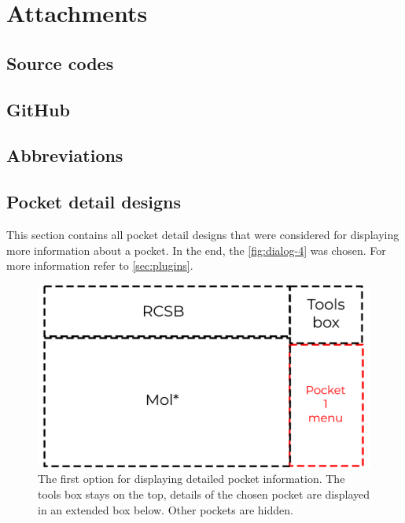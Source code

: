 \chapter{Attachments}

\section{Source codes}

\section{GitHub}

\section{Abbreviations}

\section{Pocket detail designs}
\label{sec:pocket_detail_designs}

This section contains all pocket detail designs that were considered for displaying more information about a pocket. In the end, the \cref{fig:dialog-4} was chosen. For more information refer to \cref{sec:plugins}.

\begin{figure}[htb]
    \centering
    \includegraphics[width=\linewidth]{img/dialog_1-svg.pdf}
    \caption{The first option for displaying detailed pocket information. The tools box stays on the top, details of the chosen pocket are displayed in an extended box below. Other pockets are hidden.}
    \label{fig:dialog-1}
\end{figure}

